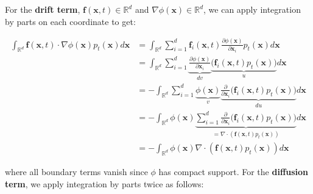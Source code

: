 \documentclass{article}
\begin{document}
For the \textbf{drift term}, $\boldsymbol{f}(\boldsymbol{x},t)\in \mathbb{R}^d$ and $\nabla \phi(\boldsymbol{x})\in \mathbb{R}^d$, we can apply integration by parts on each coordinate to get:
\begin{small}
\begin{align}
    \int_{\mathbb{R}^d}\boldsymbol{f}(\boldsymbol{x},t)\cdot \nabla \phi(\boldsymbol{x})p_t(\boldsymbol{x})d\boldsymbol{x}&=\int_{\mathbb{R}^d}\sum_{i=1}^d\boldsymbol{f}_i(\boldsymbol{x},t) \frac{\partial\phi(\boldsymbol{x})}{\partial \boldsymbol{x}_i}p_t(\boldsymbol{x})d\boldsymbol{x}\nonumber\\
    &=\int_{\mathbb{R}^d}\sum_{i=1}^d\underbrace{\frac{\partial\phi(\boldsymbol{x})}{\partial \boldsymbol{x}_i}}_{dv}\underbrace{\big(\boldsymbol{f}_i(\boldsymbol{x},t) p_t(\boldsymbol{x})\big)}_{u}d\boldsymbol{x}\tag{1st integration by parts}\\
    &=-\int_{\mathbb{R}^d}\sum_{i=1}^d\underbrace{\phi(\boldsymbol{x})}_{v}\underbrace{\frac{\partial}{\partial \boldsymbol{x}_i}\big(\boldsymbol{f}_i(\boldsymbol{x},t) p_t(\boldsymbol{x})\big)}_{du}d\boldsymbol{x}\tag{2nd integration by parts}\nonumber\\
    &=-\int_{\mathbb{R}^d}\phi(\boldsymbol{x})\underbrace{\sum_{i=1}^d\frac{\partial}{\partial \boldsymbol{x}_i}\big(\boldsymbol{f}_i(\boldsymbol{x},t) p_t(\boldsymbol{x})\big)}_{=\nabla\cdot (\boldsymbol{f}(\boldsymbol{x},t) p_t(\boldsymbol{x}))}d\boldsymbol{x}\nonumber\\
    &=\boxed{-\int_{\mathbb{R}^d}\phi(\boldsymbol{x})\nabla\cdot (\boldsymbol{f}(\boldsymbol{x},t) p_t(\boldsymbol{x}))d\boldsymbol{x}}\tag{drift term}
\end{align}
\end{small}
where all boundary terms vanish since $\phi$ has compact support. For the \textbf{diffusion term}, we apply integration by parts twice as follows:
\end{document}
